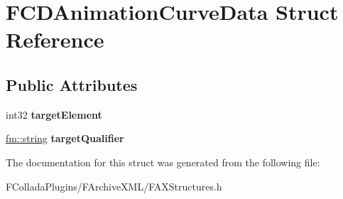 \hypertarget{structFCDAnimationCurveData}{
\section{FCDAnimationCurveData Struct Reference}
\label{structFCDAnimationCurveData}
}
\subsection*{Public Attributes}
\begin{DoxyCompactItemize}
\item 
\hypertarget{structFCDAnimationCurveData_a57a1100f4df2dff9c49b246473f0e971}{
int32 {\bfseries targetElement}}
\label{structFCDAnimationCurveData_a57a1100f4df2dff9c49b246473f0e971}

\item 
\hypertarget{structFCDAnimationCurveData_aedf498a272d5a310c68771b844375a6b}{
\hyperlink{classfm_1_1stringT}{fm::string} {\bfseries targetQualifier}}
\label{structFCDAnimationCurveData_aedf498a272d5a310c68771b844375a6b}

\end{DoxyCompactItemize}


The documentation for this struct was generated from the following file:\begin{DoxyCompactItemize}
\item 
FColladaPlugins/FArchiveXML/FAXStructures.h\end{DoxyCompactItemize}
